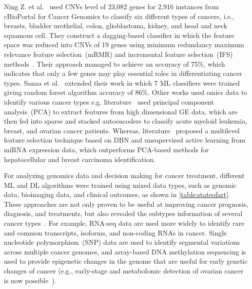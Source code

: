 \hspace*{3.5mm} Ning Z. et al.~\cite{zhang2016classification} used CNVs level of 23,082 genes for 2,916 instances from cBioPortal for Cancer Genomics to classify six different types of cancers, i.e., breasts, bladder urothelial, colon, glioblastoma, kidney, and head and neck squamous cell. They construct a dagging-based classifier in which the feature space was reduced into CNVs of 19 genes using minimum redundancy maximum relevance feature selection~(mRMR) and incremental feature selection~(IFS) methods~\cite{zhang2016classification}. Their approach managed to achieve an accuracy of 75\%, which indicates that only a few genes may play essential roles in differentiating cancer types. Sanaa et al.~\cite{elsadek2018supervised} extended their work in which 7 ML classifiers were trained giving random forest algorithm accuracy of 86\%. Other works used omics data to identify various cancer types e.g. literature~\cite{fakoor} used principal component analysis~(PCA) to extract features from high dimensional GE data, which are then fed into sparse and stacked autoencoders to classify acute myeloid leukemia, breast, and ovarian cancer patients. Whereas, literature~\cite{ibrahim} proposed a multilevel feature selection technique based on DBN and unsupervised active learning from miRNA expression data, which outperforms PCA-based methods for hepatocellular and breast carcinoma identification.

\hspace*{3.5mm} For analyzing genomics data and decision making for cancer treatment, different ML and DL algorithms were trained using mixed data types, such as genomic data, bioimaging data, and clinical outcomes, as shown in \cref{table:stateofart}. These approaches are not only proven to be useful at improving cancer prognosis, diagnosis, and treatments, but also revealed the subtypes information of several cancer types~\cite{66Huang}. For example, RNA-seq data are used more widely to identify rare and common transcripts, isoforms, and non-coding RNAs in cancer. Single nucleotide polymorphism~(SNP) data are used to identify segmental variations across multiple cancer genomes, and array-based DNA methylation sequencing is used to provide epigenetic changes in the genome that are useful for early genetic changes of cancer (e.g., early-stage and metabolomic detection of ovarian cancer is now possible~\cite{82Tomczak,95Gaul}). 

